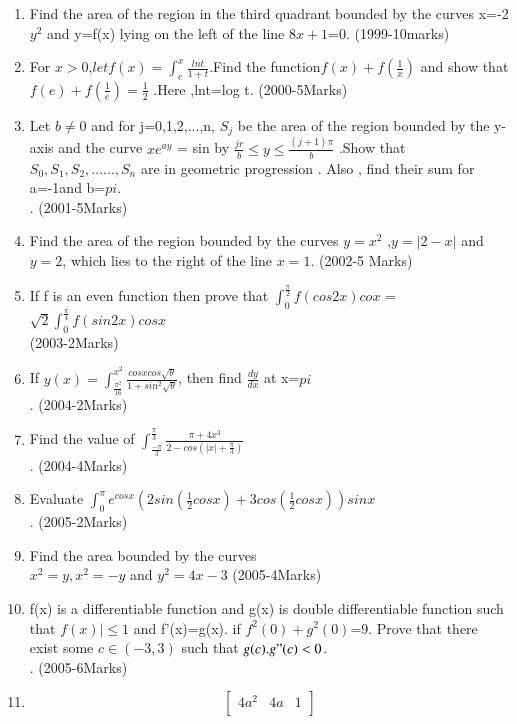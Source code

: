 \documentclass[journal,12pt,twocolumn]{IEEEtran}
\theoremstyle{remark}
\begin{document}
\begin{enumerate}
\item Find the area of the region in the third quadrant bounded by the curves x=-2$y^2$ and y=f(x) lying on the left of the line $8x+1$=0. 						
\hfill{(1999-10marks)}\\
\item For $x > 0 $,$let f(x)=\int_{e}^{x}\frac{lnt}{1+t}$.Find the function$ f(x) + f(\frac{1}{x})$
and show that $f(e)+f(\frac{1}{e})=
\frac{1}{2}$ .Here ,lnt=log t.
\hfill{(2000-5Marks)}
\item Let $b\neq0$ and for j=0,1,2,...,n, $S_j$ be the area of the region bounded by the y-axis and the curve $xe^{ay}$ = sin by $\frac{jr}{b} \le y \le \frac{(j+1)\pi}{b}$ .Show that  $S_0,S_1,S_2,......,S_n$ are in geometric progression . Also , find their sum for a=-1and b=$pi$.\\.
\hfill{(2001-5Marks)}
\item Find the area of the region bounded by the curves $y=x^2$ ,$y=|2-x|$ and $y=2$, which lies to the right of the line $x=1$.
\hfill{(2002-5 Marks)}
\item If f is an even function then prove that 	$\int_{0}^{\frac{\pi}{2}}f(cos2x)cox $ =$\sqrt{2}\int_{0}^{\frac{\pi}{4}}f(sin2x)cosx$\\						
\hfill{(2003-2Marks)}
\item If $y(x)=\int_{\frac{\pi^2}{16}}^{x^2}\frac{cosxcos\sqrt{\theta}}{1+sin^2\sqrt{\theta}}$, then find $\frac{dy}{dx}$ at x=$pi$\\.
\hfill{(2004-2Marks)}
\item  Find the value of $\int_{\frac{-\pi}{3}}^{\frac{\pi}{3}}\frac{\pi+4x^3}{2-cos(|x|+\frac{\pi}{3})}$\\.
\hfill{(2004-4Marks)}
\item Evaluate $\int_{0}^{\pi}e^{cosx}(2sin(\frac{1}{2}cosx)+3cos(\frac{1}{2}cosx))sinx$\\.
\hfill{(2005-2Marks)}
\item Find the area bounded by the curves \\  
$x^2=y,x^2=-y$ and $y^2=4x-3$
\hfill{(2005-4Marks)}
\item  f(x) is a differentiable function and g(x) is  double differentiable function such that $f(x)|\le1$ and f'(x)=g(x). if $f^2(0)+g^2(0)$=9. Prove that there exist some $c\in(-3,3)$ such that $g(c).g"(c)<0$.\\.
\hfill{(2005-6Marks)}
\item 
  \[
\begin{bmatrix}
4a^2 & 4a & 1\\

\end{bmatrix}\]
\end{enumerate}
\end{document}
